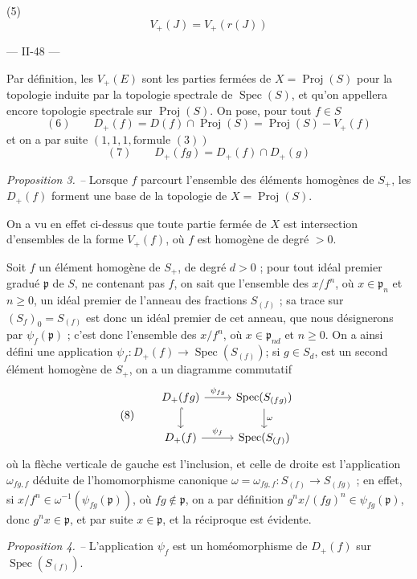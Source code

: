 (5) $$V_+(J) = V_+(r(J))$$

\newpage


--- II-48 ---

Par définition, les $V_+(E)$ sont les parties fermées de $X = \operatorname{Proj}(S)$ pour la topologie induite par la topologie spectrale de $\operatorname{Spec}(S)$, et qu'on appellera encore topologie spectrale sur $\operatorname{Proj}(S)$. On pose, pour tout $f \in S$
$$(6) \qquad D_+(f) = D(f) \cap \operatorname{Proj}(S) = \operatorname{Proj}(S) - V_+(f)$$
et on a par suite $(1, 1, 1, \text{formule } (3))$
$$(7) \qquad D_+(fg) = D_+(f) \cap D_+(g)$$

\emph{Proposition 3. --} Lorsque $f$ parcourt l'ensemble des éléments homogènes de $S_+$, les $D_+(f)$ forment une base de la topologie de $X = \operatorname{Proj}(S)$.

On a vu en effet ci-dessus que toute partie fermée de $X$ est intersection d'ensembles de la forme $V_+(f)$, où $f$ est homogène de degré $>0$.

Soit $f$ un élément homogène de $S_+$, de degré $d > 0$ ; pour tout idéal premier gradué $\mathfrak{p}$ de $S$, ne contenant pas $f$, on sait que l'ensemble des $x/f^n$, où $x \in \mathfrak{p}_n$ et $n \ge 0$, un idéal premier de l'anneau des fractions $S_{(f)}$ ; sa trace sur $(S_f)_0 = S_{(f)}$ est donc un idéal premier de cet anneau, que nous désignerons par $\psi_f(\mathfrak{p})$ ; c'est donc l'ensemble des $x/f^n$, où $x \in \mathfrak{p}_{nd}$ et $n \ge 0$. On a ainsi défini une application $\psi_f : D_+(f) \to \operatorname{Spec}(S_{(f)})$; si $g \in S_d$, est un second élément homogène de $S_+$, on a un diagramme commutatif
$$(8) \qquad \begin{tikzcd} D_+(fg) \arrow[r, "\psi_{fg}"] \arrow[d, hook] & \operatorname{Spec}(S_{(fg)}) \arrow[d, "\omega"] \\ D_+(f) \arrow[r, "\psi_f"] & \operatorname{Spec}(S_{(f)}) \end{tikzcd}$$
où la flèche verticale de gauche est l'inclusion, et celle de droite est l'application $\omega_{fg,f}$ déduite de l'homomorphisme canonique $\omega = \omega_{fg,f} : S_{(f)} \to S_{(fg)}$ ; en effet, si $x/f^n \in \omega^{-1}(\psi_{fg}(\mathfrak{p}))$, où $fg \notin \mathfrak{p}$, on a par définition $g^n x / (fg)^n \in \psi_{fg}(\mathfrak{p})$, donc $g^n x \in \mathfrak{p}$, et par suite $x \in \mathfrak{p}$, et la réciproque est évidente.

\emph{Proposition 4. --} L'application $\psi_f$ est un homéomorphisme de $D_+(f)$ sur $\operatorname{Spec}(S_{(f)})$.

